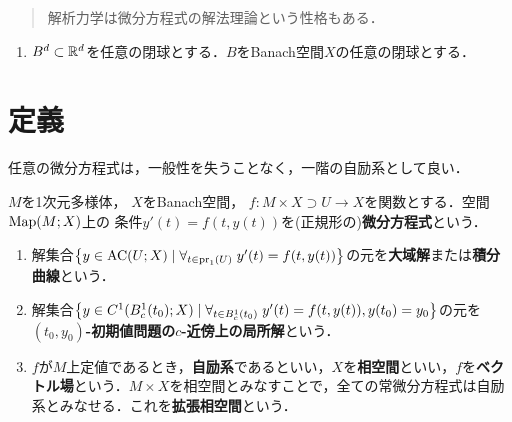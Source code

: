 \documentclass[uplatex, dvipdfmx]{jsreport}
\begin{document}
\begin{quotation}
    解析力学は微分方程式の解法理論という性格もある．
\end{quotation}

\begin{notation}\mbox{}
    \begin{enumerate}
        \item $B^d\subset\mathbb{R}^d$を任意の閉球とする．$B$をBanach空間$X$の任意の閉球とする．
    \end{enumerate}
\end{notation}

\section{定義}

\begin{tcolorbox}[colframe=ForestGreen, colback=ForestGreen!10!white,breakable,colbacktitle=ForestGreen!40!white,coltitle=black,fonttitle=\bfseries\sffamily,
title=]
    任意の微分方程式は，一般性を失うことなく，一階の自励系として良い．
\end{tcolorbox}

\begin{definition}
    $M$を1次元多様体，
    $X$をBanach空間，
    $f:M\times X\supset U\to X$を関数とする．空間$\mathrm{Map}(M;X)$上の
    条件$y'(t)=f(t,y(t))$を(正規形の)\textbf{微分方程式}という．
    \begin{enumerate}
        \item 解集合$\left\{y\in \mathrm{AC}(U;X)\mid\forall_{t\in\mathrm{pr}_1(U)}\;y'(t)=f(t,y(t))\right\}$の元を\textbf{大域解}または\textbf{積分曲線}という．
        \item 解集合$\left\{y\in C^1(B_c^1(t_0);X)\mid\forall_{t\in B_c^1(t_0)}\;y'(t)=f(t,y(t)),y(t_0)=y_0\right\}$の元を\textbf{$(t_0,y_0)$-初期値問題の$c$-近傍上の局所解}という．
        \item $f$が$M$上定値であるとき，\textbf{自励系}であるといい，$X$を\textbf{相空間}といい，$f$を\textbf{ベクトル場}という．$M\times X$を相空間とみなすことで，全ての常微分方程式は自励系とみなせる．これを\textbf{拡張相空間}という．
    \end{enumerate}
\end{definition}
\end{document}
